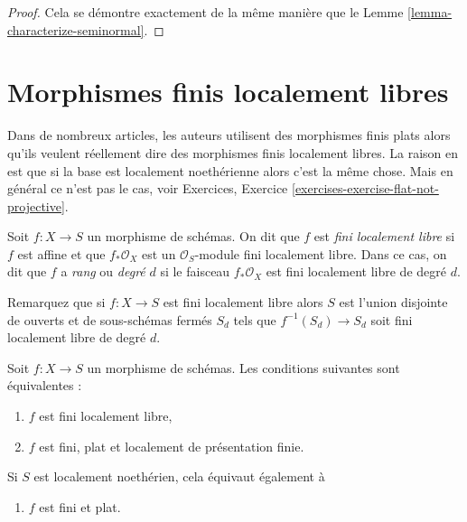 \begin{proof}
Cela se démontre exactement de la même
manière que le Lemme \ref{lemma-characterize-seminormal}.
\end{proof}





\section{Morphismes finis localement libres}
\label{section-finite-locally-free}

\noindent
Dans de nombreux articles, les auteurs utilisent des morphismes finis plats alors qu’ils
veulent réellement dire des morphismes finis localement libres. La raison en
est que si la base est localement noethérienne alors c’est la même chose. Mais
en général ce n’est pas le cas, voir Exercices, Exercice \ref{exercises-exercise-flat-not-projective}.

\begin{definition}
\label{definition-finite-locally-free}
Soit $f : X \to S$ un morphisme de schémas. On dit que $f$
est {\it fini localement libre} si $f$
est affine et que $f_*\mathcal{O}_X$ est un $\mathcal{O}_S$-module fini
localement libre. Dans ce cas, on dit que $f$ a {\it
rang} ou {\it degré}
$d$ si le faisceau $f_*\mathcal{O}_X$ est fini localement libre de degré $d$.
\end{definition}

\noindent
Remarquez que si $f : X \to S$ est fini localement libre alors $S$ est l'union disjointe
de ouverts et de sous-schémas fermés $S_d$ tels que $f^{-1}(S_d) \to S_d$ soit fini
localement libre de degré $d$.

\begin{lemma}
\label{lemma-finite-flat}
Soit $f : X \to S$ un morphisme de schémas. Les conditions
suivantes sont équivalentes :
\begin{enumerate}
\item $f$ est fini localement libre,
\item $f$ est fini, plat et localement de présentation finie.
\end{enumerate}
Si $S$ est localement noethérien, cela équivaut également à
\begin{enumerate}
\item[(3)] $f$ est fini et plat.
\end{enumerate}
\end{lemma}

